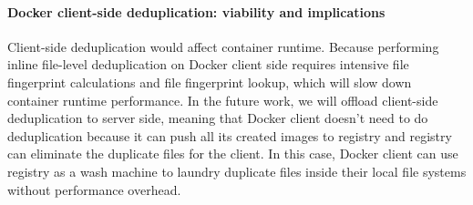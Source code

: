 \paragraph{Docker client-side deduplication: viability and implications}
Client-side deduplication would affect container runtime.%
Because performing inline file-level deduplication on Docker client side requires intensive file fingerprint calculations and file fingerprint lookup, which will slow down container runtime performance.
In the future work, we will offload client-side deduplication to server side, meaning that
Docker client doesn't need to do deduplication because
it can push all its created images to registry and registry can eliminate the duplicate files for the client. 
In this case, Docker client can use registry as a wash machine to laundry duplicate files inside their local
file systems without performance overhead.

%
%



